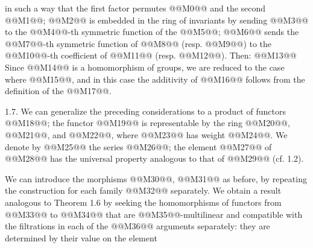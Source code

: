 in such a way that the first factor permutes @@M0@@ and the second @@M1@@; @@M2@@ is embedded in the ring of invariants by sending @@M3@@ to the @@M4@@-th symmetric function of the @@M5@@; @@M6@@ sends the @@M7@@-th symmetric function of @@M8@@ (resp. @@M9@@) to the @@M10@@-th coefficient of @@M11@@ (resp. @@M12@@). Then:
@@M13@@
Since @@M14@@ is a homomorphism of groups, we are reduced to the case where @@M15@@, and in this case the additivity of @@M16@@ follows from the definition of the @@M17@@.

1.7. We can generalize the preceding considerations to a product of functors @@M18@@; the functor @@M19@@ is representable by the ring
@@M20@@, @@M21@@, and @@M22@@, where @@M23@@ has weight @@M24@@. We denote by @@M25@@ the series @@M26@@; the element @@M27@@ of @@M28@@ has the universal property analogous to that of @@M29@@ (cf. 1.2).

We can introduce the morphisms @@M30@@, @@M31@@ as before, by repeating the construction for each family @@M32@@ separately. We obtain a result analogous to Theorem 1.6 by seeking the homomorphisms of functors from @@M33@@ to @@M34@@ that are @@M35@@-multilinear and compatible with the filtrations in each of the @@M36@@ arguments separately: they are determined by their value on the element
